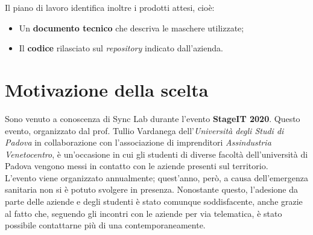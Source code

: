 Il piano di lavoro identifica inoltre i prodotti attesi, cioè:
\begin{itemize}
  \item Un \textbf{documento tecnico} che descriva le maschere utilizzate;
  \item Il \textbf{codice} rilasciato sul \textit{repository} indicato dall'azienda.
\end{itemize}


\section{Motivazione della scelta}

Sono venuto a conoscenza di Sync Lab durante l'evento \textbf{StageIT 2020}. Questo evento, organizzato dal prof. Tullio Vardanega dell'\textit{Università degli Studi di Padova} in collaborazione con l'associazione di imprenditori \textit{Assindustria Venetocentro}, è un'occasione in cui gli studenti di diverse facoltà dell'università di Padova vengono messi in contatto con le aziende presenti sul territorio. \\
L'evento viene organizzato annualmente; quest'anno, però, a causa dell'emergenza sanitaria non si è potuto svolgere in presenza. Nonostante questo, l'adesione da parte delle aziende e degli studenti è stato comunque soddisfacente, anche grazie al fatto che, seguendo gli incontri con le aziende per via telematica, è stato possibile contattarne più di una contemporaneamente. \\


